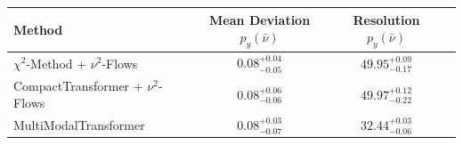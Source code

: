     \begin{tabular}{lccc}
        \toprule
        Method & Mean Deviation $p_{y}(\bar{\nu})$ & Resolution $p_{y}(\bar{\nu})$ \\
        \midrule
        $\chi^2$-Method + $\nu^2$-Flows & $0.08^{+0.04}_{-0.05}$ & $49.95^{+0.09}_{-0.17}$ \\
        CompactTransformer + $\nu^2$-Flows & $0.08^{+0.06}_{-0.06}$ & $49.97^{+0.12}_{-0.22}$ \\
        MultiModalTransformer & $0.08^{+0.03}_{-0.07}$ & $32.44^{+0.03}_{-0.06}$ \\
        \bottomrule
    \end{tabular}